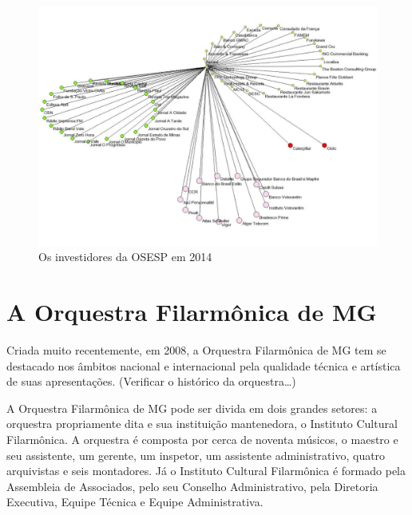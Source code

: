 \documentclass[a4paper, 12pt, openright, oneside, german, french, english, brazil]{abntex2}
\begin{document}
	\begin{figure}[!ht]
		\centering
		\caption{Os investidores da OSESP em 2014}
		\includegraphics[scale=0.55]{OSESP_patrocinio.pdf}
	\end{figure}
	
	
	
	
	
	
	
	
	
	
	
	
	
	
	
	
	
	\section{A Orquestra Filarmônica de MG}
	
	Criada muito recentemente, em 2008, a Orquestra Filarmônica de MG tem se destacado nos âmbitos nacional e internacional pela qualidade técnica e artística de suas apresentações. (Verificar o histórico da orquestra\ldots)
	
	
	
	A Orquestra Filarmônica de MG pode ser divida em dois grandes setores: a orquestra propriamente dita e sua instituição mantenedora, o Instituto Cultural Filarmônica. A orquestra é composta por cerca de noventa músicos, o maestro e seu assistente, um gerente, um inspetor, um assistente administrativo, quatro arquivistas e seis montadores. Já o Instituto Cultural Filarmônica é formado pela Assembleia de Associados, pelo seu Conselho Administrativo, pela Diretoria Executiva, Equipe Técnica e Equipe Administrativa.
	
\end{document}
